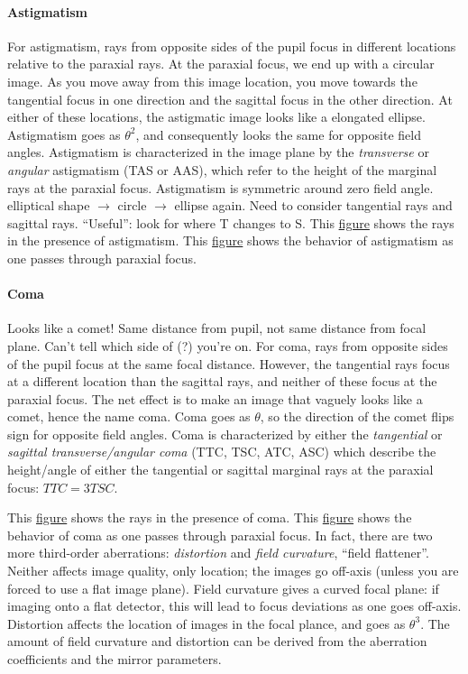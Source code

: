 \documentclass[12pt]{article}
\newcommand{\mynotes}[1]{\textcolor{myBlue}{#1}}
\begin{document}
\paragraph{Astigmatism}
For astigmatism, rays from opposite sides of the pupil focus in different
locations relative to the paraxial rays. At the paraxial focus, we end up with
a circular image. As you move away from this image location, you move towards
the tangential focus in one direction and the sagittal focus in the other
direction. At either of these locations, the astigmatic image looks like a
elongated ellipse. Astigmatism goes as $\theta^{2}$, and consequently looks the
same for opposite field angles. Astigmatism is characterized in the image plane
by the \textit{transverse} or \textit{angular} astigmatism (TAS or AAS), which
refer to the height of the marginal rays at the paraxial focus. Astigmatism is
symmetric around zero field angle.
\mynotes{%
    elliptical shape $\rightarrow$ circle $\rightarrow$ ellipse again.
    Need to consider tangential rays and sagittal rays. ``Useful'':
    look for where T changes to S.
}
This \href{http://astronomy.nmsu.edu/holtz/a535/html/diagrams/a535/astig.htm}
{figure} shows the rays in the presence of astigmatism. This \href{http://astronomy.nmsu.edu/holtz/a535/html/diagrams/a535/z5.htm}
{figure} shows the behavior of astigmatism as one passes through paraxial focus.

\paragraph{Coma}
\mynotes{%
    Looks like a comet! Same distance from pupil, not same distance
    from focal plane. Can't tell which side of (?) you're on.
}
For coma, rays from opposite sides of the pupil focus at the same focal
distance. However, the tangential rays focus at a different location than the
sagittal rays, and neither of these focus at the paraxial focus. The net effect
is to make an image that vaguely looks like a comet, hence the name coma. Coma
goes as $\theta$, so the direction of the comet flips sign for opposite field
angles. Coma is characterized by either the \textit{tangential} or \textit{sagittal
transverse/angular coma} (TTC, TSC, ATC, ASC) which describe the height/angle
of either the tangential or sagittal marginal rays at the paraxial focus: $TTC
= 3TSC$.

This \href{http://astronomy.nmsu.edu/holtz/a535/html/diagrams/a535/coma.htm}
{figure} shows the rays in the presence of coma. This \href{http://astronomy.nmsu.edu/holtz/a535/html/diagrams/a535/z7.htm}
{figure} shows the behavior of coma as one passes through paraxial focus. In
fact, there are two more third-order aberrations: \textit{distortion} and
\textit{field curvature},
\mynotes{``field flattener''}.
Neither affects image quality, only location; \mynotes{the images go off-axis}
(unless you are forced to use a flat image plane). Field curvature gives a
curved focal plane: if imaging onto a flat detector, this will lead to focus
deviations as one goes off-axis. Distortion affects the location of images in
the focal plance, and goes as $\theta^{3}$. The amount of field curvature and
distortion can be derived from the aberration coefficients and the mirror
parameters.
\end{document}
